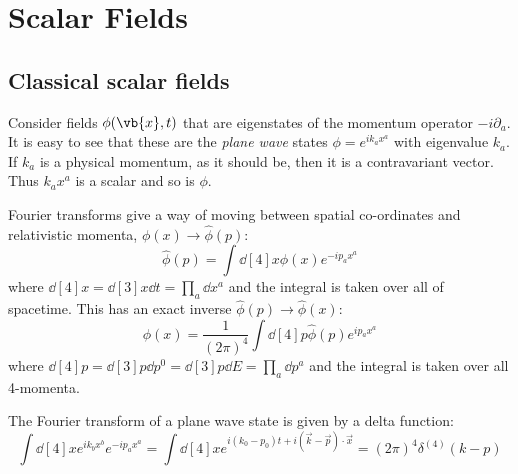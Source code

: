 \documentclass{jknotes} %
\begin{document}
\section{Scalar Fields}

\subsection{Classical scalar fields}

Consider fields \(\phi(\vb{x},t)\) that are eigenstates of the momentum operator \(-i\partial_a\). It is easy to see that these are the \emph{plane wave} states \(\phi = e^{ik_ax^a}\) with eigenvalue \(k_a\). If \(k_a\) is a physical momentum, as it should be, then it is a contravariant vector. Thus \(k_ax^a\) is a scalar and so is \(\phi\).

Fourier transforms give a way of moving between spatial co-ordinates and relativistic momenta, \(\phi(x) \rightarrow \hat\phi(p)\):
\begin{equation}
    \hat\phi(p) = \int \dd[4]{x}\phi(x)e^{-ip_ax^a}
\end{equation}
where \(\dd[4]{x} = \dd[3]{x}\dd{t} = \prod_a\dd{x^a}\) and the integral is taken over all of spacetime. This has an exact inverse \(\hat\phi(p) \rightarrow \hat\phi(x)\):
\begin{equation}
    \phi(x) = \frac{1}{(2\pi)^4}\int\dd[4]{p}\hat\phi(p)e^{ip_ax^a}
\end{equation}
where \(\dd[4]{p} = \dd[3]{p}\dd{p^0} = \dd[3]{p}\dd{E} = \prod_a \dd{p^a}\) and the integral is taken over all 4-momenta.

The Fourier transform of a plane wave state is given by a delta function:
\begin{equation}
    \int\dd[4]{x}e^{ik_bx^b}e^{-ip_ax^a} = \int\dd[4]{x}e^{i(k_0-p_0)t + i(\vec{k}-\vec{p})\cdot\vec{x}} = (2\pi)^4\delta^{(4)}(k-p)
\end{equation}
\end{document}
